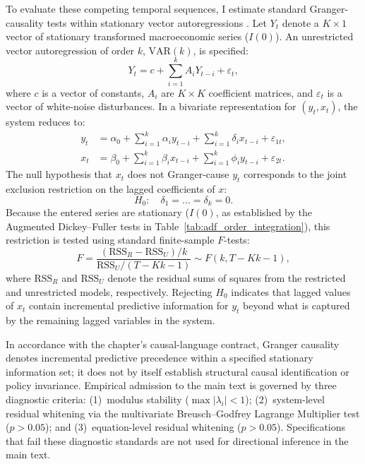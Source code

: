 To evaluate these competing temporal sequences, I estimate standard Granger-causality tests within stationary vector autoregressions \citep{Hamilton1994,Lutkepohl2005}. Let $Y_t$ denote a $K \times 1$ vector of stationary transformed macroeconomic series ($I(0)$). An unrestricted vector autoregression of order $k$, $\text{VAR}(k)$, is specified:
\begin{equation}
    Y_t = c + \sum_{i=1}^k A_i Y_{t-i} + \varepsilon_t, \label{eq:var_spec}
\end{equation}
where $c$ is a vector of constants, $A_i$ are $K \times K$ coefficient matrices, and $\varepsilon_t$ is a vector of white-noise disturbances. In a bivariate representation for $(y_t, x_t)$, the system reduces to:
\begin{align}
    y_t &= \alpha_0 + \sum_{i=1}^k \alpha_{i} y_{t-i} + \sum_{i=1}^k \delta_{i} x_{t-i} + \varepsilon_{1t}, \label{eq:granger_spec1} \\
    x_t &= \beta_0 + \sum_{i=1}^k \beta_{i} x_{t-i} + \sum_{i=1}^k \phi_{i} y_{t-i} + \varepsilon_{2t}. \label{eq:granger_spec2}
\end{align}
The null hypothesis that $x_t$ does not Granger-cause $y_t$ corresponds to the joint exclusion restriction on the lagged coefficients of $x$:
\begin{equation}
    H_0: \quad \delta_{1} = \dots = \delta_{k} = 0.
\end{equation}
Because the entered series are stationary ($I(0)$, as established by the Augmented Dickey--Fuller tests in Table~\ref{tab:adf_order_integration}), this restriction is tested using standard finite-sample $F$-tests:
\begin{equation}
    F = \frac{(\text{RSS}_R - \text{RSS}_U) / k}{\text{RSS}_U / (T - Kk - 1)} \sim F(k, T - Kk - 1),
\end{equation}
where $\text{RSS}_R$ and $\text{RSS}_U$ denote the residual sums of squares from the restricted and unrestricted models, respectively. Rejecting $H_0$ indicates that lagged values of $x_t$ contain incremental predictive information for $y_t$ beyond what is captured by the remaining lagged variables in the system. 

In accordance with the chapter's causal-language contract, Granger causality denotes incremental predictive precedence within a specified stationary information set; it does not by itself establish structural causal identification or policy invariance. Empirical admission to the main text is governed by three diagnostic criteria: (1)~modulus stability ($\max |\lambda_i| < 1$); (2)~system-level residual whitening via the multivariate Breusch--Godfrey Lagrange Multiplier test ($p > 0.05$); and (3)~equation-level residual whitening ($p > 0.05$). Specifications that fail these diagnostic standards are not used for directional inference in the main text.

